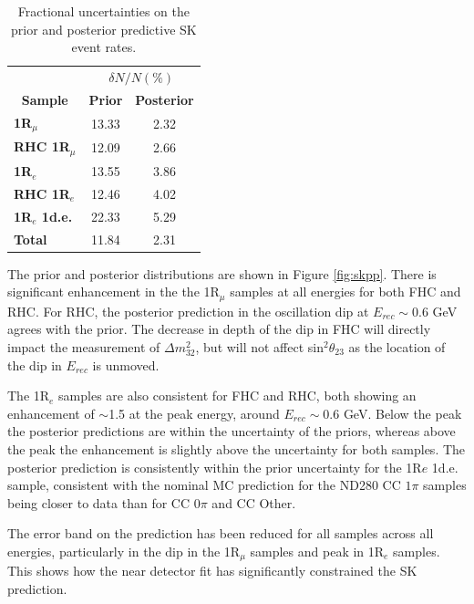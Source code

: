 \begin{center}
\begin{table}[!htbp]
\center
\begin{tabular}{l||c c}
\hline \hline
& \multicolumn{2}{c}{$\delta N/N (\%)$}\\
\multicolumn{1}{c||}{\textbf{Sample}} & \multicolumn{1}{c}{\textbf{Prior}} & \multicolumn{1}{c}{\textbf{Posterior}} \\
\hline\hline
\textbf{1R$_{\mu}$} & 13.33 & 2.32\\
\textbf{RHC 1R$_{\mu}$} & 12.09 & 2.66\\ 
\textbf{1R$_{e}$} & 13.55 & 3.86\\
\textbf{RHC 1R$_{e}$} & 12.46 & 4.02\\
\textbf{1R$_{e}$ 1d.e.} & 22.33 & 5.29\\ \hline
\textbf{Total} & 11.84 & 2.31\\ \hline\hline
\end{tabular}
\caption{Fractional uncertainties on the prior and posterior predictive SK event rates.}
\label{tab:SKerr}
\end{table}
\end{center}

The prior and posterior distributions are shown in Figure \ref{fig:skpp}. There is significant enhancement in the the 1R$_{\mu}$ samples at all energies for both FHC and RHC. For RHC, the posterior prediction in the oscillation dip at $E_{rec}\sim$0.6 GeV agrees with the prior. The decrease in depth of the dip in FHC will directly impact the measurement of $\Delta m_{32}^2$, but will not affect sin$^{2}\theta_{23}$ as the location of the dip in $E_{rec}$ is unmoved. 

The 1R$_{e}$ samples are also consistent for FHC and RHC, both showing an enhancement of $\sim$1.5 at the peak energy, around $E_{rec}\sim$0.6 GeV. Below the peak the posterior predictions are within the uncertainty of the priors, whereas above the peak the enhancement is slightly above the uncertainty for both samples. The posterior prediction is consistently within the prior uncertainty for the 1R$e$ 1d.e. sample, consistent with the nominal MC prediction for the ND280 CC $1\pi$ samples being closer to data than for CC $0\pi$ and CC Other.

The error band on the prediction has been reduced for all samples across all energies, particularly in the dip in the 1R$_{\mu}$ samples and peak in 1R$_{e}$ samples. This shows how the near detector fit has significantly constrained the SK prediction.

